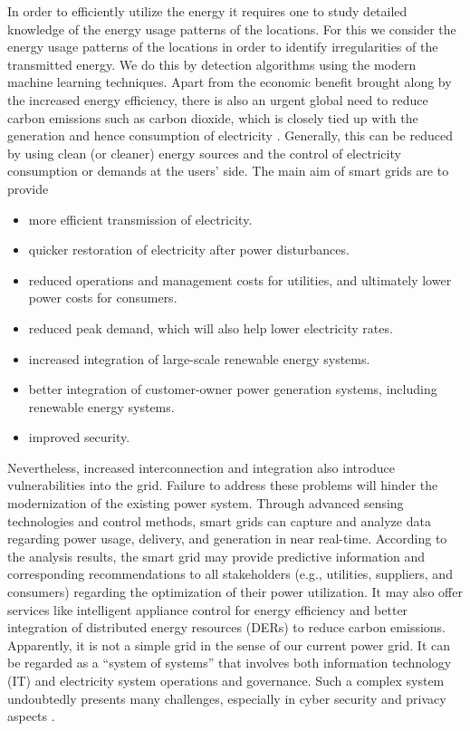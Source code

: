 In order to efficiently utilize the energy it requires one to study detailed knowledge of the energy usage patterns of the locations. For this we consider the energy usage patterns of the locations in order to identify irregularities of the transmitted energy. We do this by detection algorithms using the modern machine learning techniques. Apart  from  the  economic  benefit  brought along by the increased energy efficiency, there is also an urgent global need to reduce carbon emissions such as carbon dioxide,  which is closely tied up with the generation and hence consumption of electricity \cite{chan2012load}. Generally,  this  can  be  reduced  by  using  clean  (or cleaner) energy sources and the control of electricity consumption  or  demands  at  the  users’  side.
	The main aim of smart grids are to provide \begin{itemize}\item more efficient transmission of electricity. \item quicker restoration of electricity after power disturbances. \item reduced operations and management costs for utilities, and ultimately lower power costs for consumers. \item reduced peak demand, which will also help lower electricity rates. \item increased integration of large-scale renewable energy systems. \item better integration of customer-owner power generation systems, including renewable energy systems. \item improved security. \end{itemize}

Nevertheless, increased interconnection and integration also introduce vulnerabilities into the grid. Failure to address these problems will hinder the modernization of the existing power system. Through advanced sensing technologies and control methods, smart grids can capture and analyze data regarding power usage, delivery, and generation in near real-time. According to the analysis results, the smart grid may provide predictive information and corresponding recommendations to all stakeholders (e.g., utilities, suppliers, and consumers) regarding the optimization of their power utilization. It may also offer services like intelligent appliance control for energy efficiency and better integration of distributed energy resources (DERs) to reduce carbon emissions. Apparently, it is not a simple grid in the sense of our current power grid. It can be regarded as a “system of systems” that involves both information technology (IT) and electricity system operations and governance. Such a complex system undoubtedly presents many challenges, especially in cyber security and privacy aspects \cite{liu2012cyber}.

